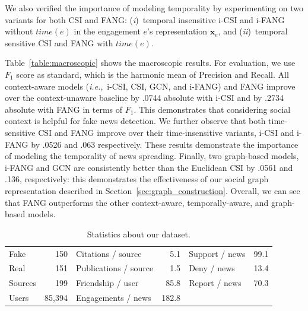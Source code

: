 \documentclass[sigconf,anonymous]{acmart}
\theoremstyle{definition}
\theoremstyle{hypothesis}
\begin{document}

We also verified the importance of modeling temporality by experimenting on two variants for both CSI and FANG: (\emph{i})~temporal insensitive i-CSI and i-FANG without $time(e)$ in the engagement $e$'s representation $\boldsymbol{x}_{e}$, and (\emph{ii})~temporal sensitive CSI and FANG with $time(e)$. 


Table~\ref{table:macroscopic} shows the macroscopic results. 
For evaluation, we use $F_1$ score as standard, which is the harmonic mean of Precision and Recall. 
All context-aware models (\textit{i.e.},~i-CSI, CSI, GCN, and i-FANG) and FANG improve over the context-unaware baseline by .0744 absolute
with i-CSI and by .2734 absolute with FANG in terms of $F_1$. This demonstrates that considering social context is helpful for fake news detection. %
We further observe that both time-sensitive CSI and FANG improve over their time-insensitive variants, i-CSI and i-FANG by .0526 and .063 respectively. These results demonstrate the importance of modeling the temporality of news spreading. Finally, two graph-based models, i-FANG and GCN are consistently better than the Euclidean CSI by .0561 and .136, respectively: this demonstrates the effectiveness of our social graph representation described in Section~\ref{sec:graph_construction}. Overall, we can see that FANG outperforms the other context-aware, temporally-aware, and graph-based models.
\begin{table}[tb]
    \centering
    \small
    \caption{Statistics about our dataset.}
    \begin{tabular}{l@{}rlrlr} 
    \toprule
        Fake & 150 & Citations / source & 5.1 &  Support / news & 99.1 \\
        Real & 151 & Publications / source & 1.5 & Deny / news & 13.4 \\
        Sources & 199 & Friendship / user & 85.8 & Report / news & 70.3 \\
        Users & 85,394 & Engagements / news & 182.8 & & \\ 
        \bottomrule
    \end{tabular}
    \label{table:dataset_statistics}
\end{table}
\end{document}
